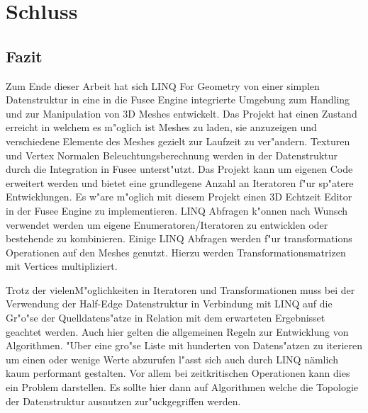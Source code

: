 \documentclass[pagesize, paper=a4, fontsize=12pt,titlepage=true, headings=small, headnosepline, abstractoff, liststotoc, nochapterprefix, plainheadsepline]{scrreprt}
\newcommand{\LFG}{LINQ For Geometry}
\newcommand{\LFGS}{LINQ For Geometry }
\newcommand{\HES}{Half-Edge Datenstruktur }
\begin{document}





\chapter {Schluss}
	\section {Fazit}
		Zum Ende dieser Arbeit hat sich \LFGS von einer simplen Datenstruktur in eine in die Fusee Engine integrierte Umgebung zum Handling und zur Manipulation von 3D Meshes entwickelt. Das Projekt hat einen Zustand erreicht in welchem es m"oglich ist Meshes zu laden, sie anzuzeigen und verschiedene Elemente des Meshes gezielt zur Laufzeit zu ver"andern. Texturen und Vertex Normalen Beleuchtungsberechnung werden in der Datenstruktur durch die Integration in Fusee unterst"utzt. Das Projekt kann um eigenen Code erweitert werden und bietet eine grundlegene Anzahl an Iteratoren f"ur sp"atere Entwicklungen. Es w"are m"oglich mit diesem Projekt einen 3D Echtzeit Editor in der Fusee Engine zu implementieren. LINQ Abfragen k"onnen nach Wunsch verwendet werden um eigene Enumeratoren/Iteratoren zu entwicklen oder bestehende zu kombinieren. Einige LINQ Abfragen werden f"ur transformations Operationen auf den Meshes genutzt. Hierzu werden Transformationsmatrizen mit Vertices multipliziert.

Trotz der vielenM"oglichkeiten in Iteratoren und Transformationen muss bei der Verwendung der \HES in Verbindung mit LINQ auf die Gr"o"se der Quelldatens"atze in Relation mit dem erwarteten Ergebnisset geachtet werden. Auch hier gelten die allgemeinen Regeln zur Entwicklung von Algorithmen. "Uber eine gro"se Liste mit hunderten von Datens"atzen zu iterieren um einen oder wenige Werte abzurufen l"asst sich auch durch LINQ nämlich kaum performant gestalten. Vor allem bei zeitkritischen Operationen kann dies ein Problem darstellen. Es sollte hier dann auf Algorithmen welche die Topologie der Datenstruktur ausnutzen zur"uckgegriffen werden.
\end{document}
